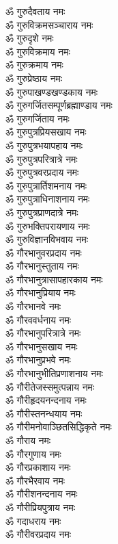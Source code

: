\begin{multicols}{2}
\begin{flushleft}
ॐ गुरुदैवताय नमः\hfill{}\\
ॐ गुरुविक्रमसञ्चाराय नमः\\
ॐ गुरुदृशे नमः\\
ॐ गुरुविक्रमाय नमः\\
ॐ गुरुक्रमाय नमः\\
ॐ गुरुप्रेष्ठाय नमः\\
ॐ गुरुपाखण्डखण्डकाय नमः\\
ॐ गुरुगर्जितसम्पूर्णब्रह्माण्डाय नमः\\
ॐ गुरुगर्जिताय नमः\\
ॐ गुरुपुत्रप्रियसखाय नमः\\
ॐ गुरुपुत्रभयापहाय नमः\hfill{}\\
ॐ गुरुपुत्रपरित्रात्रे नमः\\
ॐ गुरुपुत्रवरप्रदाय नमः\\
ॐ गुरुपुत्रार्तिशमनाय नमः\\
ॐ गुरुपुत्राधिनाशनाय नमः\\
ॐ गुरुपुत्रप्राणदात्रे नमः\\
ॐ गुरुभक्तिपरायणाय नमः\\
ॐ गुरुविज्ञानविभवाय नमः\\
ॐ गौरभानुवरप्रदाय नमः\\
ॐ गौरभानुस्तुताय नमः\\
ॐ गौरभानुत्रासापहारकाय नमः\hfill{}\\
ॐ गौरभानुप्रियाय नमः\\
ॐ गौरभानवे नमः\\
ॐ गौरववर्धनाय नमः\\
ॐ गौरभानुपरित्रात्रे नमः\\
ॐ गौरभानुसखाय नमः\\
ॐ गौरभानुप्रभवे नमः\\
ॐ गौरभानुभीतिप्रणाशनाय नमः\\
ॐ गौरीतेजस्समुत्पन्नाय नमः\\
ॐ गौरीहृदयनन्दनाय नमः\\
ॐ गौरीस्तनन्धयाय नमः\hfill{}\\
ॐ गौरीमनोवाञ्छितसिद्धिकृते नमः\\
ॐ गौराय नमः\\
ॐ गौरगुणाय नमः\\
ॐ गौरप्रकाशाय नमः\\
ॐ गौरभैरवाय नमः\\
ॐ गौरीशनन्दनाय नमः\\
ॐ गौरीप्रियपुत्राय नमः\\
ॐ गदाधराय नमः\\
ॐ गौरीवरप्रदाय नमः\\

\end{flushleft}
\end{multicols}
